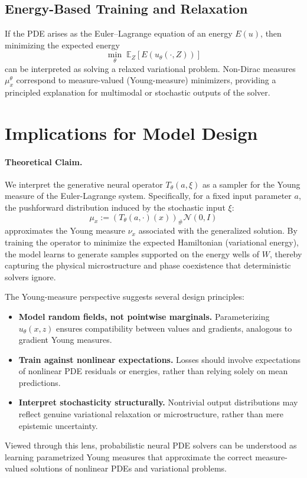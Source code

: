 \documentclass[11pt]{article}
\begin{document}
\subsection{Energy-Based Training and Relaxation}
If the PDE arises as the Euler--Lagrange equation of an energy $E(u)$, then minimizing the expected energy
\[
\min_\theta\; \mathbb{E}_Z[E(u_\theta(\cdot,Z))]
\]
can be interpreted as solving a relaxed variational problem. Non-Dirac measures $\mu_x^\theta$ correspond to measure-valued (Young-measure) minimizers, providing a principled explanation for multimodal or stochastic outputs of the solver.

\section{Implications for Model Design}
\paragraph{Theoretical Claim.} We interpret the generative neural operator $T_\theta(a, \xi)$ as a sampler for the Young measure of the Euler-Lagrange system. Specifically, for a fixed input parameter $a$, the pushforward distribution induced by the stochastic input $\xi$:$$\mu_x := (T_\theta(a, \cdot)(x))_\# \mathcal{N}(0, I)$$approximates the Young measure $\nu_x$ associated with the generalized solution. By training the operator to minimize the expected Hamiltonian (variational energy), the model learns to generate samples supported on the energy wells of $W$, thereby capturing the physical microstructure and phase coexistence that deterministic solvers ignore.


The Young-measure perspective suggests several design principles:
\begin{itemize}
\item \textbf{Model random fields, not pointwise marginals.} Parameterizing $u_\theta(x,z)$ ensures compatibility between values and gradients, analogous to gradient Young measures.
\item \textbf{Train against nonlinear expectations.} Losses should involve expectations of nonlinear PDE residuals or energies, rather than relying solely on mean predictions.
\item \textbf{Interpret stochasticity structurally.} Nontrivial output distributions may reflect genuine variational relaxation or microstructure, rather than mere epistemic uncertainty.
\end{itemize}

Viewed through this lens, probabilistic neural PDE solvers can be understood as learning parametrized Young measures that approximate the correct measure-valued solutions of nonlinear PDEs and variational problems.





\newpage



\end{document}
